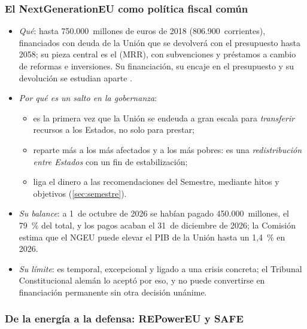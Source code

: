 \documentclass[11pt]{article}
\begin{document}
\subsubsection{El NextGenerationEU como política fiscal común}\label{sec:ngeu}

\begin{itemize}
\item \emph{Qué}: hasta 750.000~millones de euros de 2018 (806.900~corrientes), financiados con deuda de la Unión que se devolverá con el presupuesto hasta 2058; su pieza central es el  (MRR), con subvenciones y préstamos a cambio de reformas e inversiones\nocite{UE2021Reglamento241,CE2026NGEU}. Su financiación, su encaje en el presupuesto y su devolución se estudian aparte .
\item \emph{Por qué es un salto en la gobernanza}:
  \begin{itemize}
  \item es la primera vez que la Unión se endeuda a gran escala para \emph{transferir} recursos a los Estados, no solo para prestar;
  \item reparte más a los más afectados y a los más pobres: es una \emph{redistribución entre Estados} con un fin de estabilización;
  \item liga el dinero a las recomendaciones del Semestre, mediante hitos y objetivos (\ref{sec:semestre}).
  \end{itemize}
\item \emph{Su balance}: a 1~de octubre de 2026 se habían pagado 450.000~millones, el 79~\% del total, y los pagos acaban el 31~de diciembre de 2026\nocite{CE2026InformeMRR}; la Comisión estima que el NGEU puede elevar el PIB de la Unión hasta un 1,4~\% en 2026\nocite{CE2024EvalMRR}.
\item \emph{Su límite}: es temporal, excepcional y ligado a una crisis concreta; el Tribunal Constitucional alemán lo aceptó por eso, y no puede convertirse en financiación permanente sin otra decisión unánime\nocite{BVerfG2022NGEU}.
\end{itemize}

\subsubsection{De la energía a la defensa: REPowerEU y SAFE}\label{sec:defensa}
\end{document}
